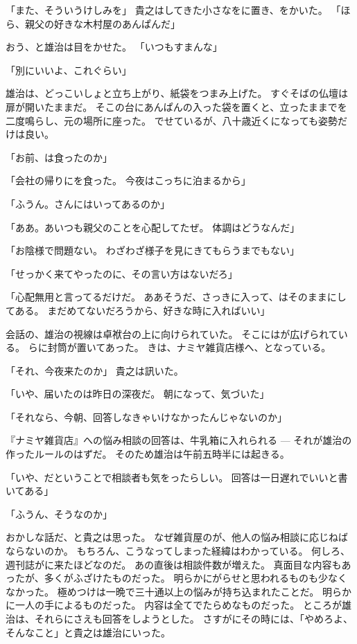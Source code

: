 \documentclass[chapter3.tex]{subfiles}
\begin{document}
\begin{CJK}{UTF8}{ipxm}
    「また、そういうけしみを」
    貴之はしてきた小さなをに置き、をかいた。
    「ほら、親父の好きな木村屋のあんぱんだ」

    おう、と雄治は目をかせた。
    「いつもすまんな」

    「別にいいよ、これぐらい」

    雄治は、どっこいしょと立ち上がり、紙袋をつまみ上げた。
    すぐそばの仏壇は扉が開いたままだ。
    そこの台にあんぱんの入った袋を置くと、立ったままでを二度鳴らし、元の場所に座った。
    でせているが、八十歳近くになっても姿勢だけは良い。

    「お前、は食ったのか」

    「会社の帰りにを食った。
    今夜はこっちに泊まるから」

    「ふうん。さんにはいってあるのか」

    「ああ。あいつも親父のことを心配してたぜ。
    体調はどうなんだ」

    「お陰様で問題ない。
    わざわざ様子を見にきてもらうまでもない」

    「せっかく来てやったのに、その言い方はないだろ」

    「心配無用と言ってるだけだ。
    ああそうだ、さっきに入って、はそのままにしてある。
    まだめてないだろうから、好きな時に入ればいい」

    会話の、雄治の視線は卓袱台の上に向けられていた。
    そこにはが広げられている。
    らに封筒が置いてあった。
    きは、ナミヤ雑貨店様へ、となっている。

    「それ、今夜来たのか」
    貴之は訊いた。

    「いや、届いたのは昨日の深夜だ。
    朝になって、気づいた」

    「それなら、今朝、回答しなきゃいけなかったんじゃないのか」

    『ナミヤ雑貨店』への悩み相談の回答は、牛乳箱に入れられる --- それが雄治の作ったルールのはずだ。
    そのため雄治は午前五時半には起きる。

    「いや、だということで相談者も気をったらしい。
    回答は一日遅れでいいと書いてある」

    「ふうん、そうなのか」

    おかしな話だ、と貴之は思った。
    なぜ雑貨屋のが、他人の悩み相談に応じねばならないのか。
    もちろん、こうなってしまった経緯はわかっている。
    何しろ、週刊誌がに来たほどなのだ。
    あの直後は相談件数が増えた。
    真面目な内容もあったが、多くがふざけたものだった。
    明らかにがらせと思われるものも少なくなかった。
    極めつけは一晩で三十通以上の悩みが持ち込まれたことだ。
    明らかに一人の手によるものだった。
    内容は全てでたらめなものだった。
    ところが雄治は、それらにさえも回答をしようとした。
    さすがにその時には、「やめろよ、そんなこと」と貴之は雄治にいった。

\end{CJK}
\end{document}
